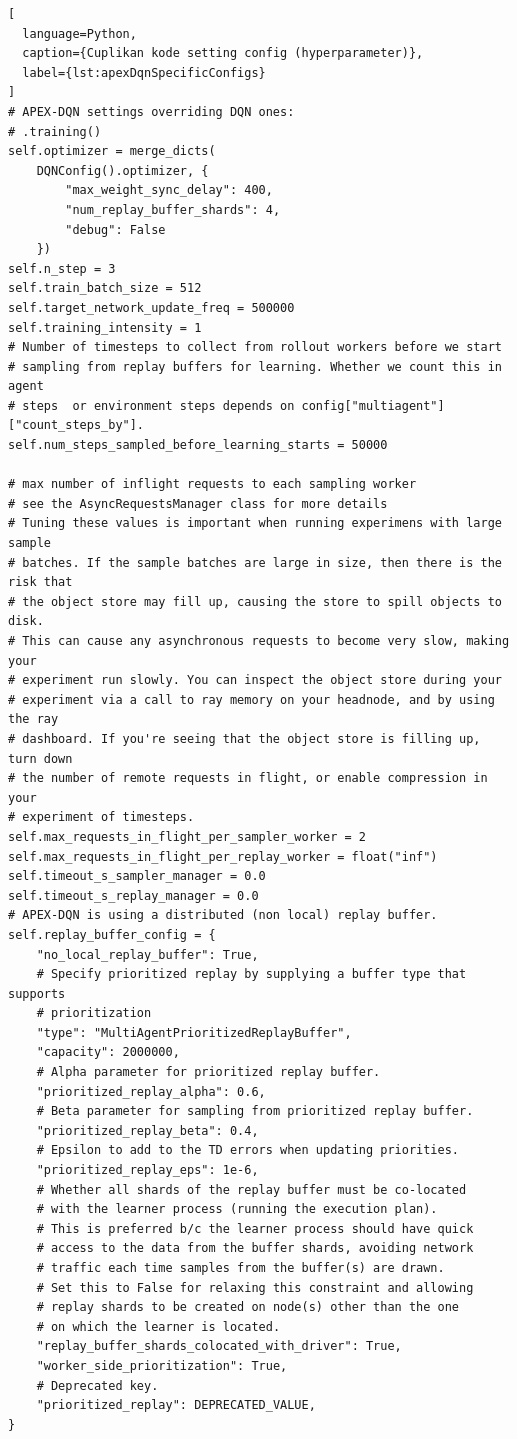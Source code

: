 \begin{lstlisting}[
  language=Python,
  caption={Cuplikan kode setting config (hyperparameter)},
  label={lst:apexDqnSpecificConfigs}
]
# APEX-DQN settings overriding DQN ones:
# .training()
self.optimizer = merge_dicts(
    DQNConfig().optimizer, {
        "max_weight_sync_delay": 400,
        "num_replay_buffer_shards": 4,
        "debug": False
    })
self.n_step = 3
self.train_batch_size = 512
self.target_network_update_freq = 500000
self.training_intensity = 1
# Number of timesteps to collect from rollout workers before we start
# sampling from replay buffers for learning. Whether we count this in agent
# steps  or environment steps depends on config["multiagent"]["count_steps_by"].
self.num_steps_sampled_before_learning_starts = 50000

# max number of inflight requests to each sampling worker
# see the AsyncRequestsManager class for more details
# Tuning these values is important when running experimens with large sample
# batches. If the sample batches are large in size, then there is the risk that
# the object store may fill up, causing the store to spill objects to disk.
# This can cause any asynchronous requests to become very slow, making your
# experiment run slowly. You can inspect the object store during your
# experiment via a call to ray memory on your headnode, and by using the ray
# dashboard. If you're seeing that the object store is filling up, turn down
# the number of remote requests in flight, or enable compression in your
# experiment of timesteps.
self.max_requests_in_flight_per_sampler_worker = 2
self.max_requests_in_flight_per_replay_worker = float("inf")
self.timeout_s_sampler_manager = 0.0
self.timeout_s_replay_manager = 0.0
# APEX-DQN is using a distributed (non local) replay buffer.
self.replay_buffer_config = {
    "no_local_replay_buffer": True,
    # Specify prioritized replay by supplying a buffer type that supports
    # prioritization
    "type": "MultiAgentPrioritizedReplayBuffer",
    "capacity": 2000000,
    # Alpha parameter for prioritized replay buffer.
    "prioritized_replay_alpha": 0.6,
    # Beta parameter for sampling from prioritized replay buffer.
    "prioritized_replay_beta": 0.4,
    # Epsilon to add to the TD errors when updating priorities.
    "prioritized_replay_eps": 1e-6,
    # Whether all shards of the replay buffer must be co-located
    # with the learner process (running the execution plan).
    # This is preferred b/c the learner process should have quick
    # access to the data from the buffer shards, avoiding network
    # traffic each time samples from the buffer(s) are drawn.
    # Set this to False for relaxing this constraint and allowing
    # replay shards to be created on node(s) other than the one
    # on which the learner is located.
    "replay_buffer_shards_colocated_with_driver": True,
    "worker_side_prioritization": True,
    # Deprecated key.
    "prioritized_replay": DEPRECATED_VALUE,
}


\end{lstlisting}
